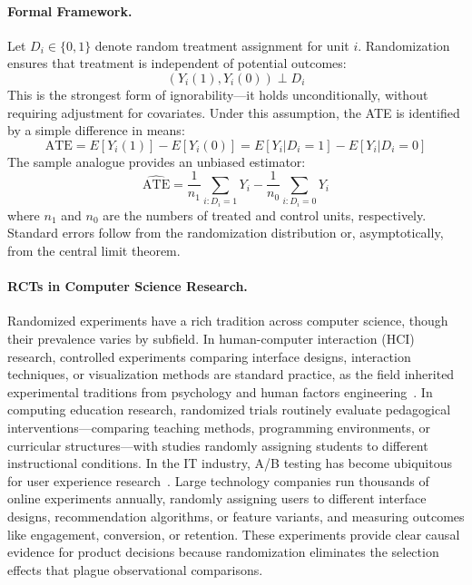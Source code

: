 \paragraph{Formal Framework.}
Let $D_i \in \{0, 1\}$ denote random treatment assignment for unit $i$.
Randomization ensures that treatment is independent of potential outcomes:
\begin{equation}
    (Y_i(1), Y_i(0)) \perp D_i
\end{equation}
This is the strongest form of ignorability---it holds unconditionally, without requiring adjustment for covariates.
Under this assumption, the ATE is identified by a simple difference in means:
\begin{equation}
    \text{ATE} = E[Y_i(1)] - E[Y_i(0)] = E[Y_i | D_i = 1] - E[Y_i | D_i = 0]
\end{equation}
The sample analogue provides an unbiased estimator:
\begin{equation}
    \widehat{\text{ATE}} = \frac{1}{n_1} \sum_{i: D_i = 1} Y_i - \frac{1}{n_0} \sum_{i: D_i = 0} Y_i
\end{equation}
where $n_1$ and $n_0$ are the numbers of treated and control units, respectively.
Standard errors follow from the randomization distribution or, asymptotically, from the central limit theorem.

\paragraph{RCTs in Computer Science Research.}
Randomized experiments have a rich tradition across computer science, though their prevalence varies by subfield.
In human-computer interaction (HCI) research, controlled experiments comparing interface designs, interaction techniques, or visualization methods are standard practice, as the field inherited experimental traditions from psychology and human factors engineering~\cite{DBLP:conf/chi/Vaithilingam0G22}.
In computing education research, randomized trials routinely evaluate pedagogical interventions---comparing teaching methods, programming environments, or curricular structures---with studies randomly assigning students to different instructional conditions.
In the IT industry, A/B testing has become ubiquitous for user experience research~\cite{kohavi2020trustworthy}.
Large technology companies run thousands of online experiments annually, randomly assigning users to different interface designs, recommendation algorithms, or feature variants, and measuring outcomes like engagement, conversion, or retention.
These experiments provide clear causal evidence for product decisions because randomization eliminates the selection effects that plague observational comparisons.

